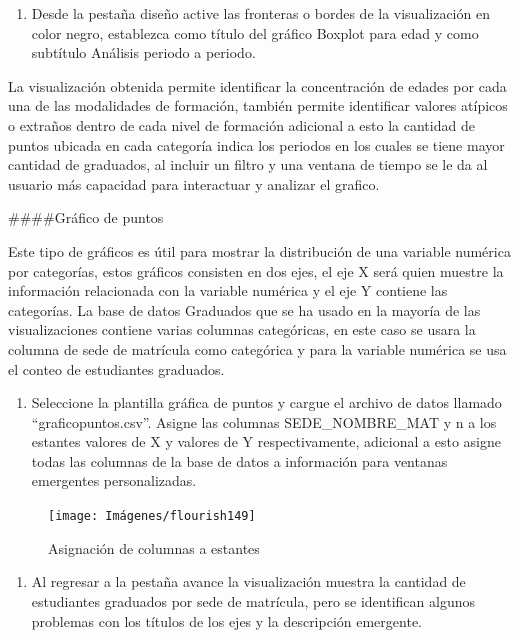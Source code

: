 \documentclass[
]{book}
\providecommand{\tightlist}{%
  \setlength{\itemsep}{0pt}\setlength{\parskip}{0pt}}
\begin{document}
\begin{enumerate}
\def\labelenumi{\arabic{enumi}.}
\setcounter{enumi}{7}
\tightlist
\item
  Desde la pestaña diseño active las fronteras o bordes de la visualización en color negro, establezca como título del gráfico Boxplot para edad y como subtítulo Análisis periodo a periodo.
\end{enumerate}

La visualización obtenida permite identificar la concentración de edades por cada una de las modalidades de formación, también permite identificar valores atípicos o extraños dentro de cada nivel de formación adicional a esto la cantidad de puntos ubicada en cada categoría indica los periodos en los cuales se tiene mayor cantidad de graduados, al incluir un filtro y una ventana de tiempo se le da al usuario más capacidad para interactuar y analizar el grafico.

\#\#\#\#Gráfico de puntos

Este tipo de gráficos es útil para mostrar la distribución de una variable numérica por categorías, estos gráficos consisten en dos ejes, el eje X será quien muestre la información relacionada con la variable numérica y el eje Y contiene las categorías. La base de datos Graduados que se ha usado en la mayoría de las visualizaciones contiene varias columnas categóricas, en este caso se usara la columna de sede de matrícula como categórica y para la variable numérica se usa el conteo de estudiantes graduados.

\begin{enumerate}
\def\labelenumi{\arabic{enumi}.}
\tightlist
\item
  Seleccione la plantilla gráfica de puntos y cargue el archivo de datos llamado ``graficopuntos.csv''. Asigne las columnas SEDE\_NOMBRE\_MAT y n a los estantes valores de X y valores de Y respectivamente, adicional a esto asigne todas las columnas de la base de datos a información para ventanas emergentes personalizadas.
\end{enumerate}

\begin{figure}

{\centering \texttt{[image: Imágenes/flourish149]} 

}

\caption{Asignación de columnas a estantes}\label{fig:paso1puntosflourish-fig}
\end{figure}

\begin{enumerate}
\def\labelenumi{\arabic{enumi}.}
\setcounter{enumi}{1}
\tightlist
\item
  Al regresar a la pestaña avance la visualización muestra la cantidad de estudiantes graduados por sede de matrícula, pero se identifican algunos problemas con los títulos de los ejes y la descripción emergente.
\end{enumerate}
\end{document}
